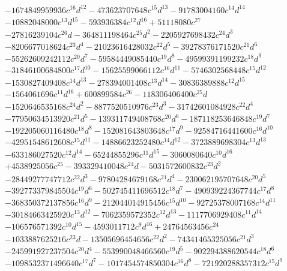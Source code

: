 {\begin{align*}
&-1674849959936c^{16}d^{12}-473623707648c^{15}d^{13}-91783004160c^{14}d^{14}\\
&-10882048000c^{13}d^{15}-593936384c^{12}d^{16}+51118080c^{27}\\
&-27816239104c^{26}d-364811198464c^{25}d^{2}-2205927698432c^{24}d^{3}\\
&-8206677018624c^{23}d^{4}-21023616428032c^{22}d^{5}-39278376171520c^{21}d^{6}\\
&-55262609242112c^{20}d^{7}-59584449085440c^{19}d^{8}-49599391199232c^{18}d^{9}\\
&-31846100684800c^{17}d^{10}-15625599066112c^{16}d^{11}-5746302568448c^{15}d^{12}\\
&-1530827409408c^{14}d^{13}-278394001408c^{13}d^{14}-30836389888c^{12}d^{15}\\
&-1564061696c^{11}d^{16}+600899584c^{26}-118306406400c^{25}d\\
&-1520646535168c^{24}d^{2}-8877520510976c^{23}d^{3}-31742601084928c^{22}d^{4}\\
&-77950634513920c^{21}d^{5}-139311749408768c^{20}d^{6}-187118253646848c^{19}d^{7}\\
&-192205060116480c^{18}d^{8}-152081643803648c^{17}d^{9}-92584716441600c^{16}d^{10}\\
&-42951548612608c^{15}d^{11}-14886623252480c^{14}d^{12}-3723889698304c^{13}d^{13}\\
&-633186027520c^{12}d^{14}-65244855296c^{11}d^{15}-3060080640c^{10}d^{16}\\
&+4538925056c^{25}-393329410048c^{24}d-5031572600832c^{23}d^{2}\\
&-28449277747712c^{22}d^{3}-97804284679168c^{21}d^{4}-230062195707648c^{20}d^{5}\\
&-392773379845504c^{19}d^{6}-502745411696512c^{18}d^{7}-490939224367744c^{17}d^{8}\\
&-368350372137856c^{16}d^{9}-212044014915456c^{15}d^{10}-92725378007168c^{14}d^{11}\\
&-30184663425920c^{13}d^{12}-7062359572352c^{12}d^{13}-1117706929408c^{11}d^{14}\\
&-106576571392c^{10}d^{15}-4593011712c^{9}d^{16}+24764563456c^{24}\\
&-1033887625216c^{23}d-13505696454656c^{22}d^{2}-74341465325056c^{21}d^{3}\\
&-245991927237504c^{20}d^{4}-553990048466560c^{19}d^{5}-902294388620544c^{18}d^{6}\\
&-1098532371496640c^{17}d^{7}-1017454574850304c^{16}d^{8}-721920288357312c^{15}d^{9}\\

\end{align*}}
